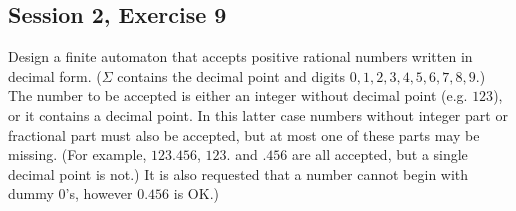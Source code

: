 \subsection{Session 2, Exercise 9}


Design a finite automaton that accepts positive rational numbers written in decimal form. ($\Sigma$ contains the decimal point and digits $0,1,2,3,4,5,6,7,8,9$.) The number to be accepted is either an integer without decimal point (e.g. $123$), or it contains a decimal point. In this latter case numbers without integer part or fractional part must also be accepted, but at most one of these parts may be missing. (For example, $123.456$, $123.$ and $.456$ are all accepted, but a single decimal point is not.) It is also requested that a number cannot begin with dummy $0$'s, however $0.456$ is OK.)

